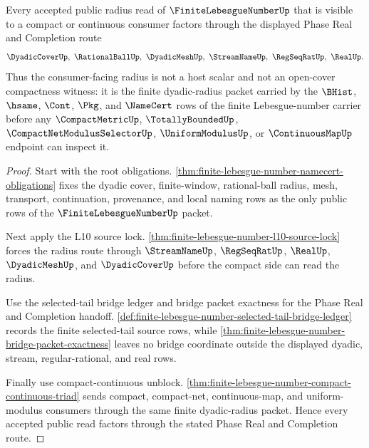 \begin{theorem}
\label{thm:finite-lebesgue-number-phase-real-source-lock}
Every accepted public radius read of $\FiniteLebesgueNumberUp$ that is visible to a compact or continuous consumer factors through the displayed Phase Real and Completion route
$$
\DyadicCoverUp,\ \RationalBallUp,\ \DyadicMeshUp,\ \StreamNameUp,\ \RegSeqRatUp,\ \RealUp .
$$
Thus the consumer-facing radius is not a host scalar and not an open-cover compactness witness: it is the finite dyadic-radius packet carried by the $\BHist$, $\hsame$, $\Cont$, $\Pkg$, and $\NameCert$ rows of the finite Lebesgue-number carrier before any $\CompactMetricUp$, $\TotallyBoundedUp$, $\CompactNetModulusSelectorUp$, $\UniformModulusUp$, or $\ContinuousMapUp$ endpoint can inspect it.
\end{theorem}
\begin{proof}
Start with the root obligations. \autoref{thm:finite-lebesgue-number-namecert-obligations} fixes the dyadic cover, finite-window, rational-ball radius, mesh, transport, continuation, provenance, and local naming rows as the only public rows of the $\FiniteLebesgueNumberUp$ packet.

Next apply the L10 source lock. \autoref{thm:finite-lebesgue-number-l10-source-lock} forces the radius route through $\StreamNameUp$, $\RegSeqRatUp$, $\RealUp$, $\DyadicMeshUp$, and $\DyadicCoverUp$ before the compact side can read the radius.

Use the selected-tail bridge ledger and bridge packet exactness for the Phase Real and Completion handoff. \autoref{def:finite-lebesgue-number-selected-tail-bridge-ledger} records the finite selected-tail source rows, while \autoref{thm:finite-lebesgue-number-bridge-packet-exactness} leaves no bridge coordinate outside the displayed dyadic, stream, regular-rational, and real rows.

Finally use compact-continuous unblock. \autoref{thm:finite-lebesgue-number-compact-continuous-triad} sends compact, compact-net, continuous-map, and uniform-modulus consumers through the same finite dyadic-radius packet. Hence every accepted public read factors through the stated Phase Real and Completion route.
\end{proof}


